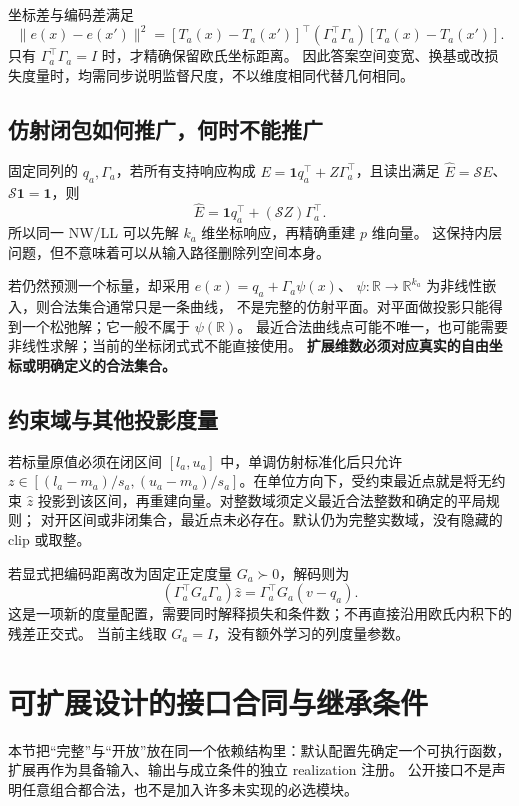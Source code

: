 \documentclass[11pt,UTF8,fontset=fandol]{ctexart}
\numberwithin{equation}{section}
\theoremstyle{definition}
\begin{document}
坐标差与编码差满足
\begin{equation}
 \|e(x)-e(x')\|^2
 =[T_a(x)-T_a(x')]^\top(\Gamma_a^\top\Gamma_a)[T_a(x)-T_a(x')].
 \label{v52:eq:general-code-metric}
\end{equation}
只有 $\Gamma_a^\top\Gamma_a=I$ 时，才精确保留欧氏坐标距离。
因此答案空间变宽、换基或改损失度量时，均需同步说明监督尺度，不以维度相同代替几何相同。

\subsection{仿射闭包如何推广，何时不能推广}
固定同列的 $q_a,\Gamma_a$，若所有支持响应构成
$E=\bm1q_a^\top+Z\Gamma_a^\top$，且读出满足
$\widehat E=\mathcal S E$、$\mathcal S\bm1=\bm1$，则
\begin{equation}
 \widehat E=\bm1q_a^\top+(\mathcal SZ)\Gamma_a^\top.
 \label{v52:eq:general-closure}
\end{equation}
所以同一 NW/LL 可以先解 $k_a$ 维坐标响应，再精确重建 $p$ 维向量。
这保持内层问题，但不意味着可以从输入路径删除列空间本身。

若仍然预测一个标量，却采用 $e(x)=q_a+\Gamma_a\psi(x)$、
$\psi:\mathbb R\to\mathbb R^{k_a}$ 为非线性嵌入，则合法集合通常只是一条曲线，
不是完整的仿射平面。对平面做投影只能得到一个松弛解；它一般不属于 $\psi(\mathbb R)$。
最近合法曲线点可能不唯一，也可能需要非线性求解；当前的坐标闭式式不能直接使用。
\textbf{扩展维数必须对应真实的自由坐标或明确定义的合法集合。}

\subsection{约束域与其他投影度量}
若标量原值必须在闭区间 $[l_a,u_a]$ 中，单调仿射标准化后只允许
$z\in[(l_a-m_a)/s_a,(u_a-m_a)/s_a]$。在单位方向下，受约束最近点就是将无约束
$\widehat z$ 投影到该区间，再重建向量。对整数域须定义最近合法整数和确定的平局规则；
对开区间或非闭集合，最近点未必存在。默认仍为完整实数域，没有隐藏的 clip 或取整。

若显式把编码距离改为固定正定度量 $G_a\succ0$，解码则为
\begin{equation}
 (\Gamma_a^\top G_a\Gamma_a)\widehat z
 =\Gamma_a^\top G_a(v-q_a).
 \label{v52:eq:metric-projection}
\end{equation}
这是一项新的度量配置，需要同时解释损失和条件数；不再直接沿用欧氏内积下的残差正交式。
当前主线取 $G_a=I$，没有额外学习的列度量参数。



\section{可扩展设计的接口合同与继承条件}
\label{v52:app:open-contracts}
本节把“完整”与“开放”放在同一个依赖结构里：默认配置先确定一个可执行函数，
扩展再作为具备输入、输出与成立条件的独立 realization 注册。
公开接口不是声明任意组合都合法，也不是加入许多未实现的必选模块。
\end{document}
